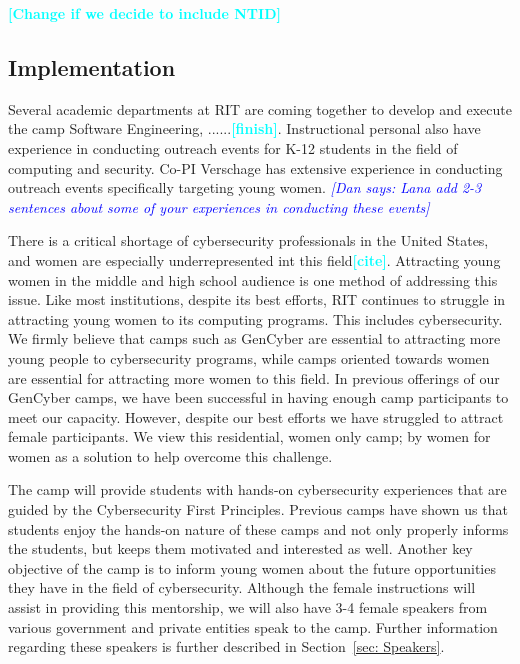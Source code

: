 \documentclass[12pt]{article}
\newcommand{\todo}[1]{\textcolor{cyan}{\textbf{[#1]}}}
\newcommand{\dan}[1]{\textcolor{blue}{{\it [Dan says: #1]}}}
\begin{document}
\todo{Change if we decide to include NTID}


\subsection{Implementation}

Several academic departments at RIT are coming together to develop and execute the camp Software Engineering, ......\todo{finish}. Instructional personal also have experience in conducting outreach events for K-12 students in the field of computing and security. Co-PI Verschage has extensive experience in conducting outreach events specifically targeting young women. \dan{Lana add 2-3 sentences about some of your experiences in conducting these events}

There is a critical shortage of cybersecurity professionals in the United States, and women are especially underrepresented int this field\todo{cite}. Attracting young women in the middle and high school audience is one method of addressing this issue. Like most institutions, despite its best efforts, RIT continues to struggle in attracting young women to its computing programs. This includes cybersecurity. We firmly believe that camps such as GenCyber are essential to attracting more young people to cybersecurity programs, while camps oriented towards women are essential for attracting more women to this field. In previous offerings of our GenCyber camps, we have been successful in having enough camp participants to meet our capacity. However, despite our best efforts we have struggled to attract female participants. We view this residential, women only camp; by women for women as a solution to help overcome this challenge.

The camp will provide students with hands-on cybersecurity experiences that are guided by the Cybersecurity First Principles. Previous camps have shown us that students enjoy the hands-on nature of these camps and not only properly informs the students, but keeps them motivated and interested as well. Another key objective of the camp is to inform young women about the future opportunities they have in the field of cybersecurity. Although the female instructions will assist in providing this mentorship, we will also have 3-4 female speakers from various government and private entities speak to the camp. Further information regarding these speakers is further described in Section~\ref{sec: Speakers}.
\end{document}
